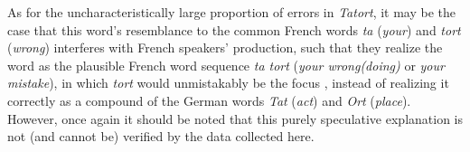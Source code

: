 			
			As for the uncharacteristically large proportion of errors in \textit{Tatort}, it may be the case that this word's resemblance to the common French words \textit{ta} (\textit{your}) and \textit{tort} (\textit{wrong}) interferes with French speakers' production, such that they realize the word as the plausible French word sequence \textit{ta tort} (\textit{your wrong(doing)} or \textit{your mistake}), in which \textit{tort} would unmistakably be the focus , instead of realizing it correctly as a compound of the German words \textit{Tat} (\textit{act}) and \textit{Ort} (\textit{place}).
			However, once again it should be noted that this
			purely speculative explanation is not (and cannot be) verified by the data collected here.  
			
			
